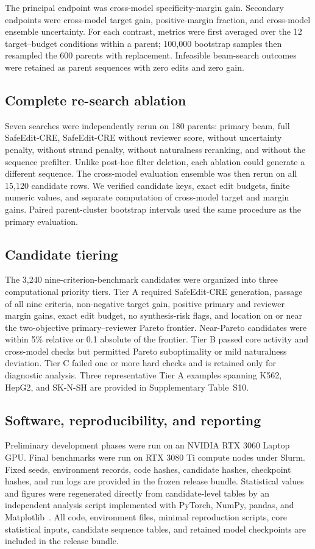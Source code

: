 The principal endpoint was cross-model specificity-margin gain. Secondary endpoints
were cross-model target gain, positive-margin fraction, and cross-model ensemble
uncertainty. For each contrast, metrics were first averaged over the 12
target--budget conditions within a parent; 100,000 bootstrap samples then resampled
the 600 parents with replacement. Infeasible beam-search outcomes were retained as
parent sequences with zero edits and zero gain.

\subsection{Complete re-search ablation}

Seven searches were independently rerun on 180 parents: primary beam, full
SafeEdit-CRE, SafeEdit-CRE without reviewer score, without uncertainty penalty,
without strand penalty, without naturalness reranking, and without the sequence
prefilter. Unlike post-hoc filter deletion, each ablation could generate a different
sequence. The cross-model evaluation ensemble was then rerun on all 15,120 candidate
rows. We verified candidate keys, exact edit budgets, finite numeric values, and
separate computation of cross-model target and margin gains. Paired parent-cluster
bootstrap intervals used the same procedure as the primary evaluation.

\subsection{Candidate tiering}

The 3,240 nine-criterion-benchmark candidates were organized into three computational
priority tiers. Tier A required SafeEdit-CRE generation, passage of all nine
criteria, non-negative target gain, positive primary and reviewer margin gains, exact
edit budget, no synthesis-risk flags, and location on or near the two-objective
primary--reviewer Pareto frontier. Near-Pareto candidates were within 5\% relative or
0.1 absolute of the frontier. Tier B passed core activity and cross-model checks but
permitted Pareto suboptimality or mild naturalness deviation. Tier C failed one or
more hard checks and is retained only for diagnostic analysis. Three representative
Tier A examples spanning K562, HepG2, and SK-N-SH are provided in Supplementary
Table~S10.

\subsection{Software, reproducibility, and reporting}

Preliminary development phases were run on an NVIDIA RTX 3060 Laptop GPU. Final
benchmarks were run on RTX 3080 Ti compute nodes under Slurm. Fixed seeds, environment
records, code hashes, candidate hashes, checkpoint hashes, and run logs are provided
in the frozen release bundle. Statistical values and figures were
regenerated directly from candidate-level tables by an independent analysis script
implemented with PyTorch, NumPy, pandas, and
Matplotlib~\citep{Paszke2019,Harris2020,McKinney2010,Hunter2007}. All code,
environment files, minimal reproduction scripts, core statistical inputs, candidate
sequence tables, and retained model checkpoints are included in the release bundle.
